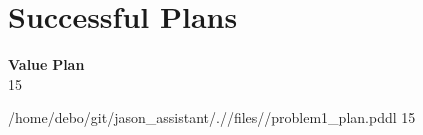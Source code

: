 \documentclass[a4paper,12pt]{article}
\begin{document}
\section{Successful Plans}
\begin{tabbing}
{\bf Value} \qquad \= {\bf Plan}\\[0.8ex]
15 \>\begin{minipage}[t]{12cm} /\-home/\-debo/\-git/\-jason\_assistant/\-./\-/\-files/\-/\-problem1\_plan.pddl 15  \end{minipage}\\
 \>\\
\end{tabbing}
\end{document}
